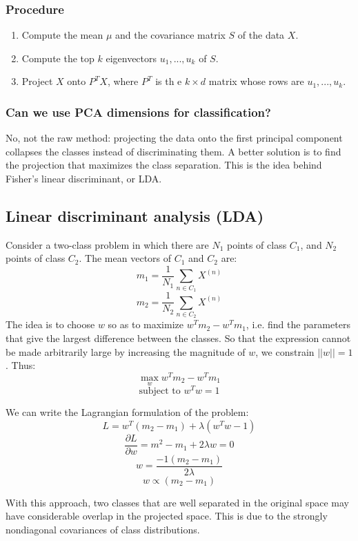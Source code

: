 \documentclass[a4paper,12pt]{article}
\begin{document}
\subsubsection{Procedure}

\begin{enumerate}
\item
Compute the mean $\mu$ and the covariance matrix $S$ of the data $X$. 
\item
Compute the top $k$ eigenvectors $u_1, ..., u_k$ of $S$. 
\item
Project $X$ onto $P^TX$, where $P^T$ is th e $k\times d$ matrix whose rows are $u_1, ..., u_k$. 
\end{enumerate}

\subsubsection{Can we use PCA dimensions for classification?}

No, not the raw method: projecting the data onto the first principal component collapses the classes instead of discriminating them. A better solution is to find the projection that maximizes the class separation. This is the idea behind Fisher's linear discriminant, or LDA. 

\subsection{Linear discriminant analysis (LDA)}

Consider a two-class problem in which there are $N_1$ points of class $C_1$, and $N_2$ points of class $C_2$. The mean vectors of $C_1$ and $C_2$ are: 
$$m_1 = \frac{1}{N_1} \sum_{n\in C_1} X^{(n)}$$
$$m_2 = \frac{1}{N_2} \sum_{n\in C_2} X^{(n)}$$
The idea is to choose $w$ so as to maximize $w^Tm_2 - w^Tm_1$, i.e. find the parameters that give the largest difference between the classes. So that the expression cannot be made arbitrarily large by increasing the magnitude of $w$, we constrain $||w||=1$. Thus: 
$$\max_w w^Tm_2 - w^Tm_1$$
$$\text{subject to }w^Tw = 1$$

We can write the Lagrangian formulation of the problem: 
$$L = w^T(m_2 - m_1) + \lambda(w^Tw - 1)$$
$$\frac{\partial L}{\partial w} = m^2 - m_1 + 2 \lambda w = 0$$
$$w = \frac{-1(m_2 - m_1)}{2\lambda}$$
$$w \propto (m_2 - m_1)$$

With this approach, two classes that are well separated in the original space may have considerable overlap in the projected space. This is due to the strongly nondiagonal covariances of class distributions. 
\end{document}
